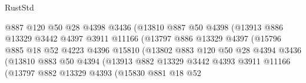 \begin{lexlean}{RustStd}
\begin{coremodule}
                                  @887
                                  @120
                                  @50
                                  @28
                                  @4398
                                  @3436
                                  (@13810
                                    @887
                                    @50
                                    @4398
                                    (@13913
                                      @886
                                      @13329
                                      @3442
                                      @4397
                                      @3911
                                      @11166
                                      (@13797
                                        @886
                                        @13329
                                        @4397
                                        (@15796
                                          @885
                                          @18
                                          @52
                                          @4223
                                          @4396
                                          @15810
                                          (@13802
                                            @883
                                            @120
                                            @50
                                            @28
                                            @4394
                                            @3436
                                            (@13810
                                              @883
                                              @50
                                              @4394
                                              (@13913
                                                @882
                                                @13329
                                                @3442
                                                @4393
                                                @3911
                                                @11166
                                                (@13797
                                                  @882
                                                  @13329
                                                  @4393
                                                  (@15830
                                                    @881
                                                    @18
                                                    @52

\end{coremodule}
\end{lexlean}
